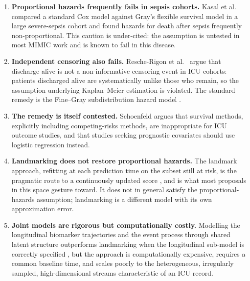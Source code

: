 \begin{enumerate}
    \item \textbf{Proportional hazards frequently fails in sepsis cohorts.}
    Kasal et al.\ \cite{kasal2004cox} compared a standard Cox model against
    Gray's flexible survival model in a large severe-sepsis cohort and found
    hazards for death after sepsis frequently non-proportional. This caution
    is under-cited: the assumption is untested in most MIMIC work and is known
    to fail in this disease.

    \item \textbf{Independent censoring also fails.} Resche-Rigon et al.\
    \cite{rescherigon2006competing} argue that discharge alive is not a
    non-informative censoring event in ICU cohorts: patients discharged alive
    are systematically unlike those who remain, so the assumption underlying
    Kaplan--Meier estimation is violated. The standard remedy is the Fine--Gray
    subdistribution hazard model \cite{finegray1999subdistribution}.

    \item \textbf{The remedy is itself contested.} Schoenfeld
    \cite{schoenfeld2006survival} argues that survival methods, explicitly
    including competing-risks methods, are inappropriate for ICU outcome
    studies, and that studies seeking prognostic covariates should use logistic
    regression instead.

    \item \textbf{Landmarking does not restore proportional hazards.} The
    landmark approach, refitting at each prediction time on the subset still
    at risk, is the pragmatic route to a continuously updated score
    \cite{vanhouwelingen2007landmark}, and is what most proposals in this space
    gesture toward. It does not in general satisfy the proportional-hazards
    assumption; landmarking is a different model with its own approximation
    error.

    \item \textbf{Joint models are rigorous but computationally costly.} Modelling
    the longitudinal biomarker trajectories and the event process through shared
    latent structure outperforms landmarking when the longitudinal sub-model is
    correctly specified \cite{rizopoulos2017joint}, but the approach is
    computationally expensive, requires a common baseline time, and scales
    poorly to the heterogeneous, irregularly sampled, high-dimensional streams
    characteristic of an ICU record.
\end{enumerate}

